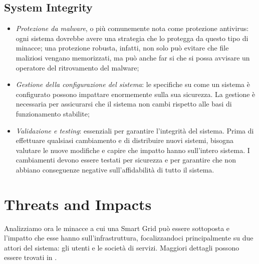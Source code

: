 \subsection{System Integrity}
\begin{itemize}
\item \textit{Protezione da malware}, o più comunemente nota come protezione antivirus: ogni sistema dovrebbe avere una strategia che lo protegga da questo tipo di minacce; una protezione robusta, infatti, non solo può evitare che file maliziosi vengano memorizzati, ma può anche far si che si possa avvisare un operatore del ritrovamento del malware;
\item \textit{Gestione della configurazione del sistema}: le specifiche su come un sistema è configurato possono impattare enormemente sulla sua sicurezza. La gestione è necessaria per assicurarsi che il sistema non cambi rispetto alle basi di funzionamento stabilite;
\item \textit{Validazione e testing}: essenziali per garantire l'integrità del sistema. Prima di effettuare qualsiasi cambiamento e di distribuire nuovi sistemi, bisogna valutare le nuove modifiche e capire che impatto hanno sull'intero sistema. I cambiamenti devono essere testati per sicurezza e per garantire che non abbiano conseguenze negative sull'affidabilità di tutto il sistema.
\end{itemize}

\section{Threats and Impacts}
Analizziamo ora le minacce a cui una Smart Grid può essere sottoposta e l'impatto che esse hanno sull'infrastruttura, focalizzandoci principalmente su due attori del sistema: gli utenti e le società di servizi. Maggiori dettagli possono essere trovati in \cite{securingSG}.
 
